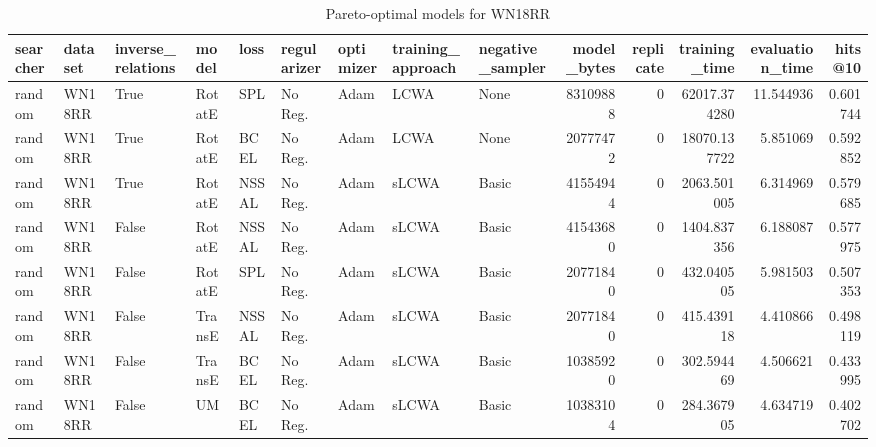 \begin{table}
\centering
\caption{Pareto-optimal models for WN18RR}
\begin{tabular}{lllllllllrrrrr}
\toprule
searcher & dataset & inverse\_relations &   model &   loss & regularizer & optimizer & training\_approach & negative\_sampler &  model\_bytes &  replicate &  training\_time &  evaluation\_time &   hits@10 \\
\midrule
  random &  WN18RR &              True &  RotatE &    SPL &     No Reg. &      Adam &              LCWA &             None &     83109888 &          0 &   62017.374280 &        11.544936 &  0.601744 \\
  random &  WN18RR &              True &  RotatE &   BCEL &     No Reg. &      Adam &              LCWA &             None &     20777472 &          0 &   18070.137722 &         5.851069 &  0.592852 \\
  random &  WN18RR &              True &  RotatE &  NSSAL &     No Reg. &      Adam &             sLCWA &            Basic &     41554944 &          0 &    2063.501005 &         6.314969 &  0.579685 \\
  random &  WN18RR &             False &  RotatE &  NSSAL &     No Reg. &      Adam &             sLCWA &            Basic &     41543680 &          0 &    1404.837356 &         6.188087 &  0.577975 \\
  random &  WN18RR &             False &  RotatE &    SPL &     No Reg. &      Adam &             sLCWA &            Basic &     20771840 &          0 &     432.040505 &         5.981503 &  0.507353 \\
  random &  WN18RR &             False &  TransE &  NSSAL &     No Reg. &      Adam &             sLCWA &            Basic &     20771840 &          0 &     415.439118 &         4.410866 &  0.498119 \\
  random &  WN18RR &             False &  TransE &   BCEL &     No Reg. &      Adam &             sLCWA &            Basic &     10385920 &          0 &     302.594469 &         4.506621 &  0.433995 \\
  random &  WN18RR &             False &      UM &   BCEL &     No Reg. &      Adam &             sLCWA &            Basic &     10383104 &          0 &     284.367905 &         4.634719 &  0.402702 \\
\bottomrule
\end{tabular}
\end{table}

